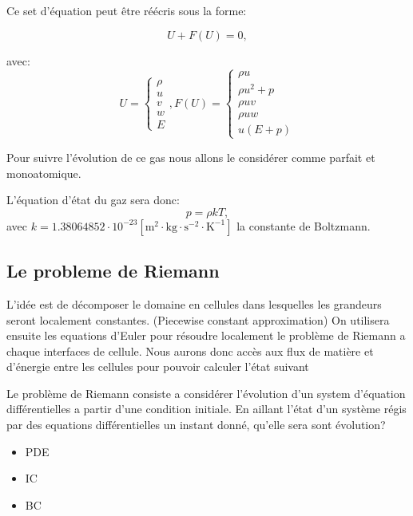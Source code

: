 Ce set d'équation peut être réécris sous la forme:

\begin{equation}
U+F(U) = 0,
\end{equation}

avec:
\begin{equation}
U=
\begin{cases}
{ \rho}\\
{ u}\\
{ v}\\
{ w}\\
{ E}
\end{cases}
,
F(U)=
\begin{cases}
{ \rho u}\\
{ \rho u^2+p}\\
{ \rho uv}\\
{ \rho uw}\\
{ u(E+p)}
\end{cases}
\end{equation}

Pour suivre l'évolution de ce gas nous allons le considérer comme parfait et monoatomique.

L’équation d'état du gaz sera donc:
\begin{equation}
p=\rho k T, 
\end{equation}
avec $k=1.38064852 \cdot 10^{-23} \left[ \mathrm{m^2 \cdot kg \cdot s^{-2} \cdot K^{-1}} \right] $ la constante de Boltzmann.


\subsection{Le probleme de Riemann}
L'idée est de décomposer le domaine en cellules dans lesquelles les grandeurs seront localement constantes. (Piecewise constant approximation)
On utilisera ensuite les equations d'Euler pour résoudre localement le problème de Riemann a chaque interfaces de cellule.
Nous aurons donc accès aux flux de matière et d'énergie entre les cellules pour pouvoir calculer l'état suivant  


Le problème de Riemann consiste a considérer l’évolution d'un system d’équation différentielles a partir d'une condition initiale.
En aillant l’état d'un système régis par des equations différentielles un instant donné, qu'elle sera sont évolution?

\begin{itemize}
\item PDE
\item IC
\item BC
\end{itemize}

